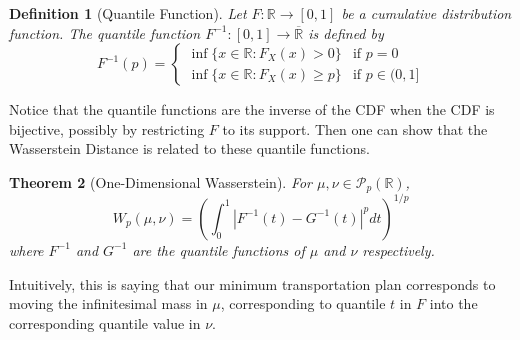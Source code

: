 \documentclass[11pt,a4paper]{article}
\newtheorem{theorem}{Theorem}[section]
\newtheorem{definition}[theorem]{Definition}
\theoremstyle{remark}
\begin{document}
\begin{definition}[Quantile Function]
Let \(F\colon\mathbb{R}\to[0,1]\) be a cumulative distribution function.  The \emph{quantile function} \(F^{-1}\colon[0,1]\to \overline{\mathbb{R}}\) is defined by
\[
  F^{-1}(p) = \begin{cases}\inf\{x \in \mathbb{R} : F_X(x) > 0\} & \text{if } p = 0 \\ \inf\{x \in \mathbb{R} : F_X(x) \geq p\} & \text{if } p \in (0,1]\end{cases}
\]
\end{definition}
\noindent Notice that the quantile functions are the inverse of the CDF when the CDF is bijective, possibly by restricting $F$ to its support.
Then one can show that the Wasserstein Distance is related to these quantile functions.
\begin{theorem}[One-Dimensional Wasserstein] \label{thm:1d} For $\mu, \nu \in \mathcal{P}_p(\mathbb{R})$,
\[
W_p(\mu,\nu) = \left(\int_0^1 |F^{-1}(t) - G^{-1}(t)|^p dt\right)^{1/p}
\]
where \( F^{-1} \) and \( G^{-1} \) are the quantile functions of $\mu$ and $\nu$ respectively.
\end{theorem}
\noindent
Intuitively, this is saying that our minimum transportation plan corresponds to moving the infinitesimal mass in $\mu$, corresponding to quantile $t$ in $F$ into the corresponding quantile value in $\nu$.
\end{document}
